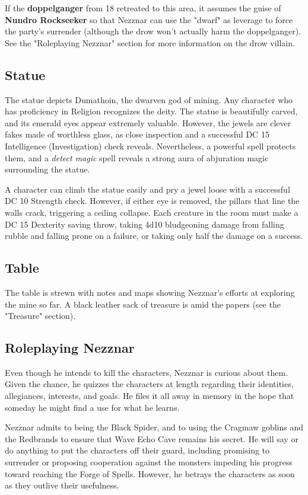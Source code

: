 \documentclass[10pt,a4paper,twoside,bg=print,twocolumn,openany,nodeprecatedcode]{dndbook}
\begin{document}
If the \textbf{doppelganger} from 18 retreated to this area, it assumes the guise of \textbf{Nundro Rockseeker} so that Nezznar can use the "dwarf" as leverage to force the party's surrender (although the drow won't actually harm the doppelganger). See the "Roleplaying Nezznar" section for more information on the drow villain.

\subsection{Statue}
The statue depicts Dumathoin, the dwarven god of mining. Any character who has proficiency in Religion recognizes the deity. The statue is beautifully carved, and its emerald eyes appear extremely valuable. However, the jewels are clever fakes made of worthless glass, as close inspection and a successful DC 15 Intelligence (Investigation) check reveals. Nevertheless, a powerful spell protects them, and a \textit{detect magic} spell reveals a strong aura of abjuration magic surrounding the statue.

A character can climb the statue easily and pry a jewel loose with a successful DC 10 Strength check. However, if either eye is removed, the pillars that line the walls crack, triggering a ceiling collapse. Each creature in the room must make a DC 15 Dexterity saving throw, taking 4d10 bludgeoning damage from falling rubble and falling prone on a failure, or taking only half the damage on a success.

\subsection{Table}
The table is strewn with notes and maps showing Nezznar's efforts at exploring the mine so far. A black leather sack of treasure is amid the papers (see the "Treasure" section).

\subsection{Roleplaying Nezznar}
Even though he intends to kill the characters, Nezznar is curious about them. Given the chance, he quizzes the characters at length regarding their identities, allegiances, interests, and goals. He files it all away in memory in the hope that someday he might find a use for what he learns.

Nezznar admits to being the Black Spider, and to using the Cragmaw goblins and the Redbrands to ensure that Wave Echo Cave remains his secret. He will say or do anything to put the characters off their guard, including promising to surrender or proposing cooperation against the monsters impeding his progress toward reaching the Forge of Spells. However, he betrays the characters as soon as they outlive their usefulness.
\end{document}
